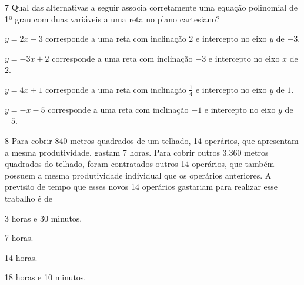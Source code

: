 \num{7} Qual das alternativas a seguir associa corretamente uma equação
polinomial de 1º grau com duas variáveis a uma reta no plano cartesiano?

\begin{escolha}
\item $y = 2x - 3$ corresponde a uma reta com inclinação $2$ e intercepto no
eixo $y$ de $-3$.
\item $y = -3x + 2$ corresponde a uma reta com inclinação $-3$ e intercepto no
eixo $x$ de $2$.
\item $y = 4x + 1$ corresponde a uma reta com inclinação $\frac{1}{4}$ e intercepto no
eixo $y$ de $1$.
\item $y = -x - 5$ corresponde a uma reta com inclinação $-1$ e intercepto no
eixo $y$ de $-5$.
\end{escolha}







\pagebreak

\num{8} Para cobrir 840 metros quadrados de um telhado, 14 operários, que apresentam a
mesma produtividade, gastam 7 horas. Para cobrir outros 3.360 metros quadrados do
telhado, foram contratados outros 14 operários, que também possuem a
mesma produtividade individual que os operários anteriores. A previsão de
tempo que esses novos 14 operários gastariam para realizar esse trabalho é de

\begin{escolha}
\item 3 horas e 30 minutos.
\item 7 horas.
\item 14 horas.
\item 18 horas e 10 minutos.
\end{escolha}

